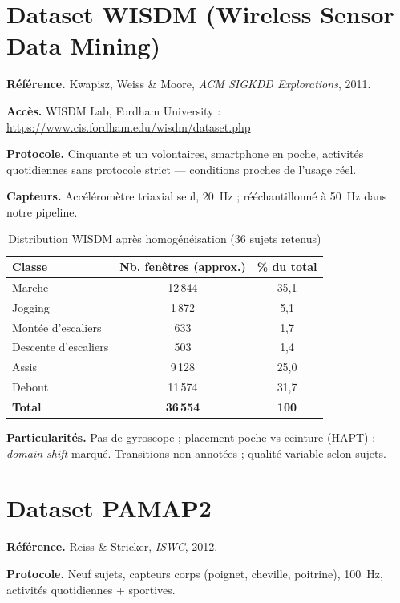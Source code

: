 \documentclass[a4paper,12pt]{report}
\begin{document}
\section{Dataset WISDM (Wireless Sensor Data Mining)}

\textbf{Référence.} Kwapisz, Weiss \& Moore, \emph{ACM SIGKDD Explorations}, 2011.

\textbf{Accès.} WISDM Lab, Fordham University :
\url{https://www.cis.fordham.edu/wisdm/dataset.php}

\textbf{Protocole.} Cinquante et un volontaires, smartphone en poche, activités
quotidiennes sans protocole strict — conditions proches de l'usage réel.

\textbf{Capteurs.} Accéléromètre triaxial seul, 20~Hz ; rééchantillonné à 50~Hz
dans notre pipeline.

\begin{table}[H]
\centering
\small
\begin{tabularx}{0.88\textwidth}{|Y|c|c|}
\hline
\textbf{Classe} & \textbf{Nb. fenêtres (approx.)} & \textbf{\% du total} \\
\hline
Marche & 12\,844 & 35,1 \\
Jogging & 1\,872 & 5,1 \\
Montée d'escaliers & 633 & 1,7 \\
Descente d'escaliers & 503 & 1,4 \\
Assis & 9\,128 & 25,0 \\
Debout & 11\,574 & 31,7 \\
\hline
\textbf{Total} & \textbf{36\,554} & \textbf{100} \\
\hline
\end{tabularx}
\caption{Distribution WISDM après homogénéisation (36 sujets retenus)}
\label{tab:annexe_wisdm}
\end{table}

\textbf{Particularités.} Pas de gyroscope ; placement poche vs ceinture (HAPT) :
\emph{domain shift} marqué. Transitions non annotées ; qualité variable selon sujets.

\section{Dataset PAMAP2}

\textbf{Référence.} Reiss \& Stricker, \emph{ISWC}, 2012.

\textbf{Protocole.} Neuf sujets, capteurs corps (poignet, cheville, poitrine),
100~Hz, activités quotidiennes + sportives.
\end{document}
